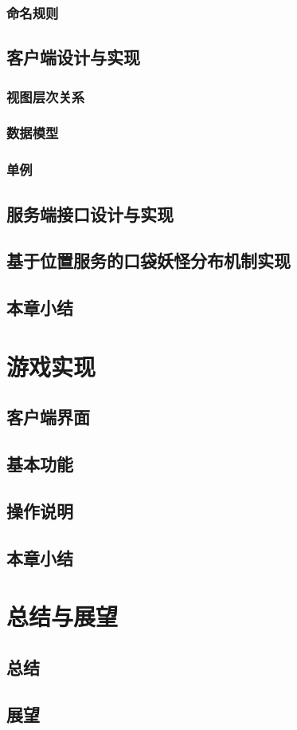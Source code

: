 \documentclass{article}
\begin{document}
\begin{CJK}{UTF8}{gbsn}
	\subsubsection{命名规则}
	\subsection{客户端设计与实现}
	\subsubsection{视图层次关系}
	\subsubsection{数据模型}
	\subsubsection{单例}
	\subsection{服务端接口设计与实现}
	\subsection{基于位置服务的口袋妖怪分布机制实现}
	\subsection{本章小结}

	\section{游戏实现}
	\subsection{客户端界面}
	\subsection{基本功能}
	\subsection{操作说明}
	\subsection{本章小结}

	\section{总结与展望}
	\subsection{总结}
	\subsection{展望}



	\end{CJK}
\end{document}
